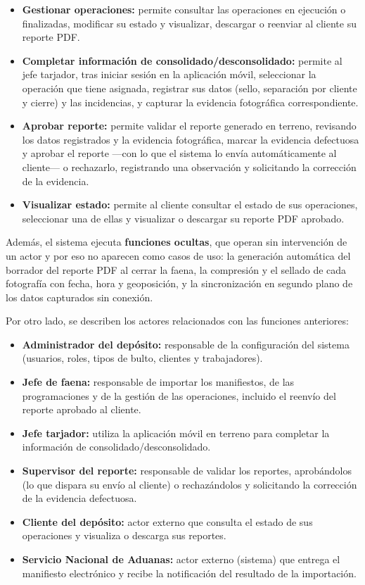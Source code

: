 \begin{itemize}
    \item \textbf{Gestionar operaciones:} permite consultar las operaciones en ejecución o
          finalizadas, modificar su estado y visualizar, descargar o reenviar al cliente su reporte
          PDF.
    \item \textbf{Completar información de consolidado/desconsolidado:} permite al jefe tarjador,
          tras iniciar sesión en la aplicación móvil, seleccionar la operación que tiene asignada,
          registrar sus datos (sello, separación por cliente y cierre) y las incidencias, y
          capturar la evidencia fotográfica correspondiente.
    \item \textbf{Aprobar reporte:} permite validar el reporte generado en terreno, revisando los
          datos registrados y la evidencia fotográfica, marcar la evidencia defectuosa y aprobar el
          reporte ---con lo que el sistema lo envía automáticamente al cliente--- o rechazarlo,
          registrando una observación y solicitando la corrección de la evidencia.
    \item \textbf{Visualizar estado:} permite al cliente consultar el estado de sus operaciones,
          seleccionar una de ellas y visualizar o descargar su reporte PDF aprobado.
\end{itemize}

Además, el sistema ejecuta \textbf{funciones ocultas}, que operan sin intervención de un actor y
por eso no aparecen como casos de uso: la generación automática del borrador del reporte PDF al
cerrar la faena, la compresión y el sellado de cada fotografía con fecha, hora y geoposición, y la
sincronización en segundo plano de los datos capturados sin conexión.

Por otro lado, se describen los actores relacionados con las funciones anteriores:

\begin{itemize}
    \item \textbf{Administrador del depósito:} responsable de la configuración del sistema
          (usuarios, roles, tipos de bulto, clientes y trabajadores).
    \item \textbf{Jefe de faena:} responsable de importar los manifiestos, de las programaciones y
          de la gestión de las operaciones, incluido el reenvío del reporte aprobado al cliente.
    \item \textbf{Jefe tarjador:} utiliza la aplicación móvil en terreno para completar la
          información de consolidado/desconsolidado.
    \item \textbf{Supervisor del reporte:} responsable de validar los reportes, aprobándolos (lo que
          dispara su envío al cliente) o rechazándolos y solicitando la corrección de la evidencia
          defectuosa.
    \item \textbf{Cliente del depósito:} actor externo que consulta el estado de sus operaciones y
          visualiza o descarga sus reportes.
    \item \textbf{Servicio Nacional de Aduanas:} actor externo (sistema) que entrega el manifiesto
          electrónico y recibe la notificación del resultado de la importación.
\end{itemize}
